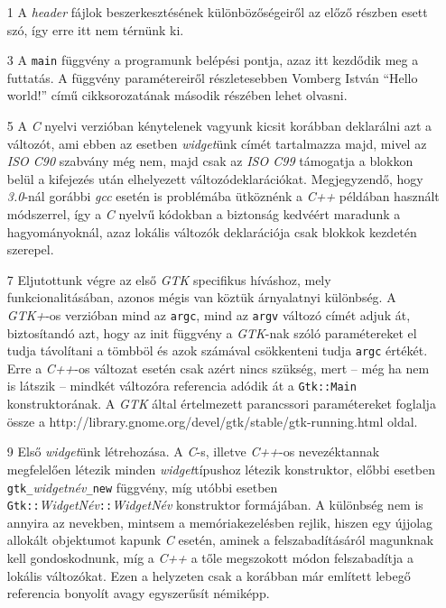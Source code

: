 \begin{enumerate}
 \item[1] A \textit{header} fájlok beszerkesztésének különbözőségeiről az előző részben esett szó, így erre itt nem térnünk ki.

 \item[3] A \texttt{main} függvény a programunk belépési pontja, azaz itt kezdődik meg a futtatás. A függvény paramétereiről részletesebben Vomberg István ``Hello world!'' című cikksorozatának második részében lehet olvasni.

 \item[5] A \textit{C} nyelvi verzióban kénytelenek vagyunk kicsit korábban deklarálni azt a változót, ami ebben az esetben \textit{widget}ünk címét tartalmazza majd, mivel az \textit{ISO C90} szabvány még nem, majd csak az \textit{ISO C99} támogatja a blokkon belül a kifejezés után elhelyezett változódeklarációkat. Megjegyzendő, hogy \textit{3.0}-nál gorábbi \textit{gcc} esetén is problémába ütköznénk a \textit{C++} példában használt módszerrel, így a \textit{C} nyelvű kódokban a biztonság kedvéért maradunk a hagyományoknál, azaz lokális változók deklarációja csak blokkok kezdetén szerepel.

 \item[7] Eljutottunk végre az első \textit{GTK} specifikus híváshoz, mely funkcionalitásában, azonos mégis van köztük árnyalatnyi különbség. A \textit{GTK+}-os verzióban mind az \texttt{argc}, mind az \texttt{argv} változó címét adjuk át, biztosítandó azt, hogy az init függvény a \textit{GTK}-nak szóló paramétereket el tudja távolítani a tömbböl és azok számával csökkenteni tudja \texttt{argc} értékét. Erre a \textit{C++}-os változat esetén csak azért nincs szükség, mert -- még ha nem is látszik -- mindkét változóra referencia adódik át a \texttt{Gtk::Main} konstruktorának. A \textit{GTK} által értelmezett parancssori paramétereket foglalja össze a http://library.gnome.org/devel/gtk/stable/gtk-running.html oldal.

 \item[9] Első \textit{widget}ünk létrehozása. A \textit{C}-s, illetve \textit{C++}-os nevezéktannak megfelelően létezik minden \textit{widget}típushoz létezik konstruktor, előbbi esetben \texttt{gtk\_}\textit{widgetnév}\texttt{\_new} függvény, míg utóbbi esetben \texttt{Gtk::}\textit{WidgetNév}\texttt{::}\textit{WidgetNév} konstruktor formájában. A különbség nem is annyira az nevekben, mintsem a memóriakezelésben rejlik, hiszen egy újjolag allokált objektumot kapunk \textit{C} esetén, aminek a felszabadításáról magunknak kell gondoskodnunk, míg a \textit{C++} a tőle megszokott módon felszabadítja a lokális változókat. Ezen a helyzeten csak a korábban már említett lebegő referencia bonyolít avagy egyszerűsít némiképp.


\end{enumerate}
